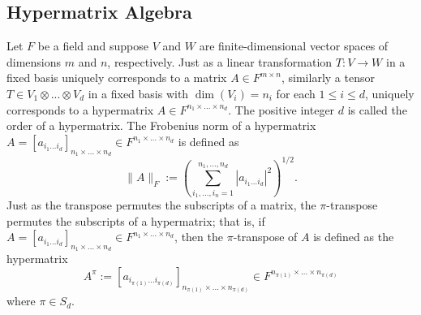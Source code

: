\documentclass{article}
\begin{document}
\subsection{Hypermatrix Algebra}
Let $F$ be a field and suppose $V$ and $W$ are finite-dimensional vector spaces of dimensions $m$ and $n$, respectively. Just as a linear transformation $T:V\rightarrow W$ in a fixed basis uniquely corresponds to a matrix $A\in F^{m\times n}$, similarly a tensor $T\in V_1\otimes...\otimes V_d$ in a fixed basis with $\dim(V_i)=n_i$ for each $1\leq i\leq d$, uniquely corresponds to a hypermatrix $A\in F^{n_1\times...\times n_d}$. The positive integer $d$ is called the order of a hypermatrix. The Frobenius norm of a hypermatrix $A = [a_{i_1...i_d}]_{n_1\times...\times n_d}\in F^{n_1\times...\times n_d}$ is defined as 
\[\|A\|_F := \left(\sum\limits_{i_1,...,i_n=1}^{n_1,...,n_d}|a_{i_1...i_d}|^2\right)^{1/2}.\]
Just as the transpose permutes the subscripts of a matrix, the $\pi$-transpose permutes the subscripts of a hypermatrix; that is, if $A = [a_{i_1...i_d}]_{n_1\times...\times n_d}\in F^{n_1\times...\times n_d}$, then the $\pi$-transpose of $A$ is defined as the hypermatrix 
\[A^{\pi} := [a_{i_{\pi(1)}...i_{\pi(d)}}]_{n_{\pi(1)}\times...\times n_{\pi(d)}}\in F^{n_{\pi(1)}\times...\times n_{\pi(d)}}\]
where $\pi\in S_d$. 
\end{document}
